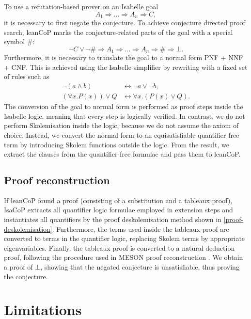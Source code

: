 \documentclass[]{article}
\begin{document}
To use a refutation-based prover on an Isabelle goal
\[ A_1 \Longrightarrow \dots \Longrightarrow A_n \Longrightarrow C, \]
it is necessary to first negate the conjecture. To achieve conjecture
directed proof search, leanCoP marks the conjecture-related parts of the
goal with a special symbol \#:
\[ \lnot C \lor \lnot \# \Longrightarrow A_1 \Longrightarrow \dots \Longrightarrow A_n \Longrightarrow \# \Longrightarrow \bot. \]
Furthermore, it is necessary to translate the goal to a normal form PNF
+ NNF + CNF. This is achieved using the Isabelle simplifier by rewriting
with a fixed set of rules such as \[\begin{split}
\lnot (a \land b) & \leftrightarrow \lnot a \lor \lnot b, \\
(\forall x. P(x)) \lor Q & \leftrightarrow \forall x. (P(x) \lor Q).
\end{split}\] The conversion of the goal to normal form is performed as
proof steps inside the Isabelle logic, meaning that every step is
logically verified. In contrast, we do not perform Skolemisation inside
the logic, because we do not assume the axiom of choice. Instead, we
convert the normal form to an equisatisfiable quantifier-free term by
introducing Skolem functions outside the logic. From the result, we
extract the clauses from the quantifier-free formulae and pass them to
leanCoP.

\subsection{Proof reconstruction}\label{proof-reconstruction}

If leanCoP found a proof (consisting of a substitution and a tableaux
proof), IsaCoP extracts all quantifier logic formulae employed in
extension steps and instantiates all quantifiers by the proof
deskolemisation method shown in \autoref{proof-deskolemisation}.
Furthermore, the terms used inside the tableaux proof are converted to
terms in the quantifier logic, replacing Skolem terms by appropriate
eigenvariables. Finally, the tableaux proof is converted to a natural
deduction proof, following the procedure used in MESON proof
reconstruction \citep{harrison1996-meson}. We obtain a proof of
\(\bot\), showing that the negated conjecture is unsatisfiable, thus
proving the conjecture.

\section{Limitations}\label{limitations}
\end{document}
